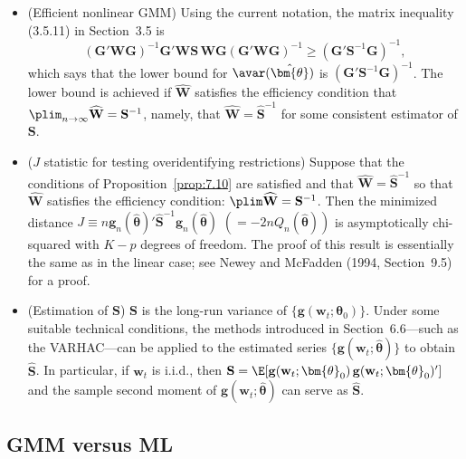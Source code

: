 \begin{itemize}
\item (Efficient nonlinear GMM) \enspace Using the current notation, the matrix inequality (3.5.11) in Section~3.5 is
\begin{equation}
\label{eq:7.3.36}
(\mathbf{G}'\mathbf{W}\mathbf{G})^{-1}\mathbf{G}'\mathbf{W}\mathbf{S}\,\mathbf{W}\mathbf{G}(\mathbf{G}'\mathbf{W}\mathbf{G})^{-1} \geq (\mathbf{G}'\mathbf{S}^{-1}\mathbf{G})^{-1},
\end{equation}
which says that the lower bound for $\avar(\hat{\bm{\theta}})$ is $(\mathbf{G}'\mathbf{S}^{-1}\mathbf{G})^{-1}$. The lower bound is achieved if $\widehat{\mathbf{W}}$ satisfies the efficiency condition that $\plim_{n\to\infty}\widehat{\mathbf{W}} = \mathbf{S}^{-1}$, namely, that $\widehat{\mathbf{W}} = \hat{\mathbf{S}}^{-1}$ for some consistent estimator of $\mathbf{S}$.

\item ($J$ statistic for testing overidentifying restrictions) \enspace Suppose that the conditions of Proposition~\ref{prop:7.10} are satisfied and that $\widehat{\mathbf{W}} = \hat{\mathbf{S}}^{-1}$ so that $\widehat{\mathbf{W}}$ satisfies the efficiency condition: $\plim \widehat{\mathbf{W}} = \mathbf{S}^{-1}$. Then the minimized distance $J \equiv n\mathbf{g}_n(\hat{\bm{\theta}})'\hat{\mathbf{S}}^{-1}\mathbf{g}_n(\hat{\bm{\theta}})$ $(= -2nQ_n(\hat{\bm{\theta}}))$ is asymptotically chi-squared with $K - p$ degrees of freedom. The proof of this result is essentially the same as in the linear case; see Newey and McFadden (1994, Section~9.5) for a proof.

\item (Estimation of $\mathbf{S}$) \enspace $\mathbf{S}$ is the long-run variance of $\{\mathbf{g}(\mathbf{w}_t; \bm{\theta}_0)\}$. Under some suitable technical conditions, the methods introduced in Section~6.6---such as the VARHAC---can be applied to the estimated series $\{\mathbf{g}(\mathbf{w}_t; \hat{\bm{\theta}})\}$ to obtain $\hat{\mathbf{S}}$. In particular, if $\mathbf{w}_t$ is i.i.d., then $\mathbf{S} = \E[\mathbf{g}(\mathbf{w}_t; \bm{\theta}_0)\,\mathbf{g}(\mathbf{w}_t; \bm{\theta}_0)']$ and the sample second moment of $\mathbf{g}(\mathbf{w}_t; \hat{\bm{\theta}})$ can serve as $\hat{\mathbf{S}}$.
\end{itemize}

\subsection*{GMM versus ML}

